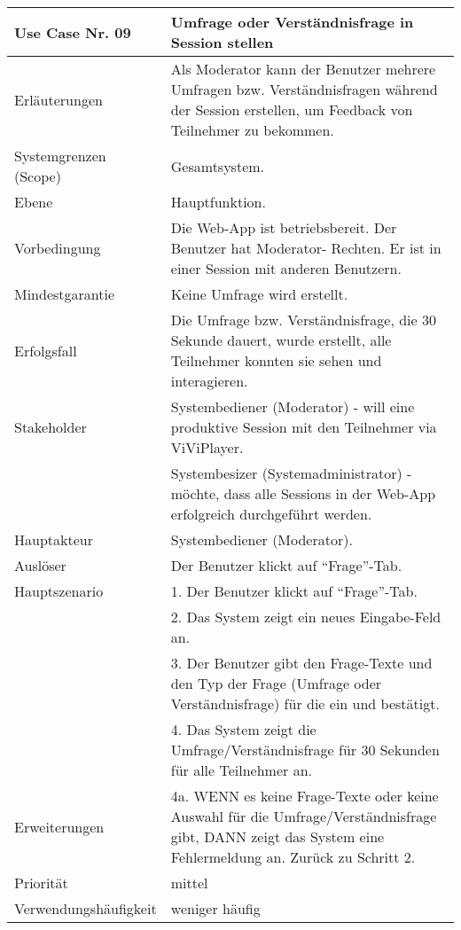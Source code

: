\begin{tabularx}{\linewidth}{|l|X|}
	\hline
	Use Case Nr. 09			& \textbf{Umfrage oder Verständnisfrage in Session stellen} \\ \hline
	Erläuterungen			& Als Moderator kann der Benutzer mehrere Umfragen bzw. Verständnisfragen
							  während der Session erstellen, um Feedback von Teilnehmer zu bekommen. \\ \hline
	Systemgrenzen (Scope)	& Gesamtsystem. \\ \hline
	Ebene					& Hauptfunktion. \\ \hline
	Vorbedingung			& Die Web-App ist betriebsbereit. Der Benutzer hat Moderator-
							  Rechten. Er ist in einer Session mit anderen Benutzern. \\ \hline
	Mindestgarantie			& Keine Umfrage wird erstellt. \\ \hline
	Erfolgsfall 			& Die Umfrage bzw. Verständnisfrage, die 30 Sekunde dauert, wurde erstellt,
							  alle Teilnehmer konnten sie sehen und interagieren. \\ \hline
	Stakeholder				& Systembediener (Moderator) - will eine produktive Session mit den 
							  Teilnehmer via ViViPlayer. \\
							& Systembesizer (Systemadministrator) - möchte, dass alle Sessions in der
							  Web-App erfolgreich durchgeführt werden. \\ \hline
	Hauptakteur				& Systembediener (Moderator). \\ \hline
	Auslöser				& Der Benutzer klickt auf ``Frage''-Tab. \\ \hline	
	Hauptszenario			& 1. Der Benutzer klickt auf ``Frage''-Tab. \\
							& 2. Das System zeigt ein neues Eingabe-Feld an. \\ 
							& 3. Der Benutzer gibt den Frage-Texte und den Typ der Frage (Umfrage
							  oder Verständnisfrage) für die ein und bestätigt. \\
							& 4. Das System zeigt die Umfrage/Verständnisfrage für 30 Sekunden für
							  alle Teilnehmer an. \\ \hline
	Erweiterungen			& 4a. WENN es keine Frage-Texte oder keine Auswahl für die 
							  Umfrage/Verständnisfrage gibt, DANN zeigt das System eine Fehlermeldung an. Zurück zu Schritt 2. \\ \hline
	Priorität				& mittel \\ \hline
	Verwendungshäufigkeit	& weniger häufig \\ \hline
\end{tabularx}